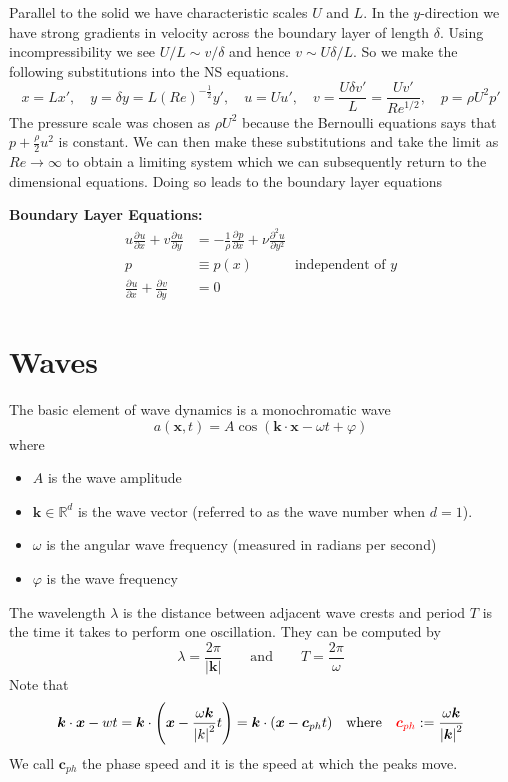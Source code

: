 \documentclass[11pt]{article}
\newcommand*{\pd}[3][]{\ensuremath{\frac{\partial^{#1} {#2}}{\partial {#3}^{#1}}}}
\newcommand{\defeq}{:=}
\newcommand{\mv}[1]{\bm{#1}}
\newcommand{\mdf}[1]{{\color{red}#1}}
\newcommand{\abs}[1]{\left|#1\right|}
\newcommand{\R}{\mathbb{R}}
\newenvironment{formula}
	{\begin{mdframed}[backgroundcolor=white, roundcorner=5pt, linewidth=1pt, linecolor=red]}
	{\end{mdframed}}
\begin{document}
Parallel to the solid we have characteristic scales $U$ and $L$.
In the $y$-direction we have strong gradients in velocity across the boundary layer of length $\delta$.
Using incompressibility we see $U/L \sim v/ \delta$ and hence $v \sim U\delta /L$.
So we make the following substitutions into the NS equations.
\[
	x = Lx', \quad y=\delta y=L(Re)^{-\frac{1}{2}}y', \quad u=Uu', \quad v=\frac{U\delta v'}{L}=\frac{Uv'}{Re^{1/2}}, \quad p=\rho U^2 p'
\]
The pressure scale was chosen as $\rho U^2$ because the Bernoulli equations says that $p+\frac{\rho}{2}u^2$ is constant.
We can then make these substitutions and take the limit as $Re\to\infty$ to obtain a limiting system which we can subsequently return to the dimensional equations.
Doing so leads to the boundary layer equations
\begin{formula}
	\textbf{Boundary Layer Equations: }
	\begin{align*}
		u\pd{u}{x} + v\pd{u}{y} &= - \frac{1}{\rho}\pd{p}{x}+\nu\pd[2]{u}{y}\\
		p & \equiv p(x) \quad\quad\quad \text{independent of }y \\
		\pd{u}{x}+ \pd{v}{y}&=0
	\end{align*}
\end{formula}

\section{Waves}
The basic element of wave dynamics is a \mdf{monochromatic wave}
\[
	a(\mv{x}, t) = A \cos\left( \mv{k}\cdot\mv{x} - \omega t + \varphi\right)
\]
where
\begin{itemize}
	\item $A$ is the \mdf{wave amplitude}
	\item $\mv{k}\in \R^d$ is the \mdf{wave vector} (referred to as the \mdf{wave number} when $d=1$).
	\item $\omega$ is the \mdf{angular wave frequency} (measured in radians per second)
	\item $\varphi$ is the \mdf{wave frequency}
\end{itemize}

The \mdf{wavelength} $\lambda$ is the distance between adjacent wave crests and \mdf{period} $T$ is the time it takes to perform one oscillation.
They can be computed by
\[
	\lambda = \frac{2\pi}{\abs{\mv{k}}} \quad \quad \text{and} \quad \quad T= \frac{2\pi}{\omega}
\]
Note that
\[
	\mv{k}\cdot\mv{x} - wt = \mv{k} \cdot \left(\mv{x} - \frac{\omega\mv{k}}{\abs{k}^2}t\right)
	=\mv{k} \cdot (\mv{x} - \mv{c}_{ph} t) \quad \text{where} \quad
	\mdf{\mv{c}_{ph}}\defeq \frac{\omega\mv{k}}{\abs{\mv{k}}^2}
\]
We call $\mv{c}_{ph}$ the \mdf{phase speed} and it is the speed at which the peaks move.
\end{document}
